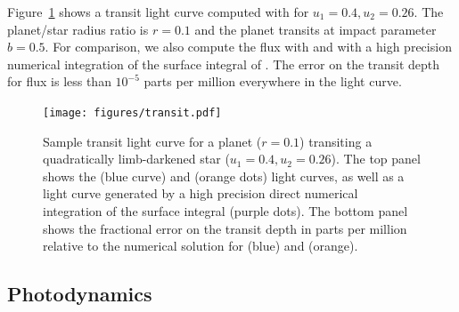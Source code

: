 \documentclass[modern]{aastex61}
\begin{document}
Figure~\ref{fig:transit} shows a transit light curve computed with \starry
for $u_1 = 0.4, u_2 = 0.26$. The planet/star radius ratio is $r = 0.1$ and
the planet transits at impact parameter $b = 0.5$. For comparison, we also
compute the flux with \batman \citep{Kreidberg2015} and with a
high precision numerical integration of the surface integral of
. The error on the transit depth for \starry flux is less
than $10^{-5}$ parts per million everywhere in the light curve.
%
\begin{figure}[ht!]
    \begin{centering}
    \texttt{[image: figures/transit.pdf]}
    \caption{\label{fig:transit}
             Sample transit light curve for a planet ($r = 0.1$) transiting a
             quadratically limb-darkened star ($u_1 = 0.4, u_2 = 0.26$). The
             top panel shows the \starry (blue curve) and \batman
             (orange dots) light curves, as well as a light curve generated
             by a high precision direct numerical integration of the surface
             integral (purple dots). The bottom panel shows the fractional
             error on the transit depth in parts per million relative to the
             numerical solution for \starry (blue) and \batman (orange).}
    \end{centering}
\end{figure}
%

\subsection{Photodynamics}
\label{sec:starryphotodynamics}
\end{document}
